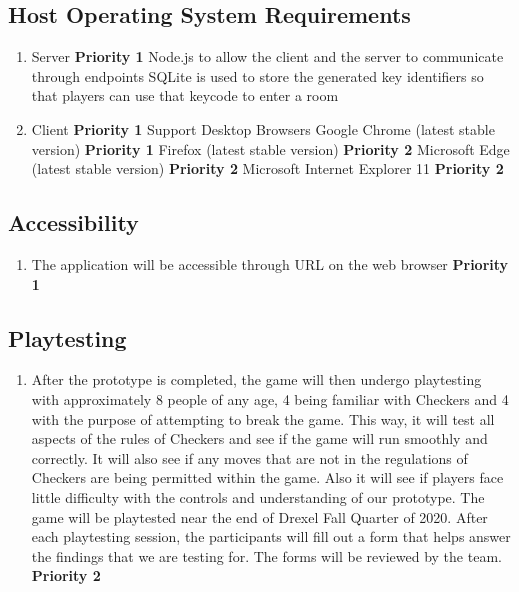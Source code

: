 \documentclass[10pt]{article}
\begin{document}
\subsection{Host Operating System Requirements}

\begin{enumerate}[label*=S\arabic*.]
    \item Server \textbf{Priority 1}
        \subitem Node.js to allow the client and the server to communicate through endpoints 
        \subitem SQLite is used to store the generated key identifiers so that players can use that keycode to enter a room
    \item Client \textbf{Priority 1}
        \subitem Support Desktop Browsers
            \subsubitem Google Chrome (latest stable version) \textbf{Priority 1}
            \subsubitem Firefox (latest stable version) \textbf{Priority 2}
            \subsubitem Microsoft Edge (latest stable version) \textbf{Priority 2}
            \subsubitem Microsoft Internet Explorer 11 \textbf{Priority 2}
\end{enumerate}

\subsection{Accessibility}

\begin{enumerate}[label*=N\arabic*.]
    \item The application will be accessible through URL on the web browser \textbf{Priority 1}
\end{enumerate}

\subsection{Playtesting}

\begin{enumerate}[label*=N\arabic*.]
    \item After the prototype is completed, the game will then undergo playtesting with approximately 8 people of any age, 4 being familiar with Checkers and 4 with the purpose of attempting to break the game. This way, it will test all aspects of the rules of Checkers and see if the game will run smoothly and correctly. It will also see if any moves that are not in the regulations of Checkers are being permitted within the game. Also it will see if players face little difficulty with the controls and understanding of our prototype. The game will be playtested near the end of Drexel Fall Quarter of 2020. After each playtesting session, the participants will fill out a form that helps answer the findings that we are testing for. The forms will be reviewed by the team. \textbf{Priority 2}
\end{enumerate}
\pagebreak
\end{document}
